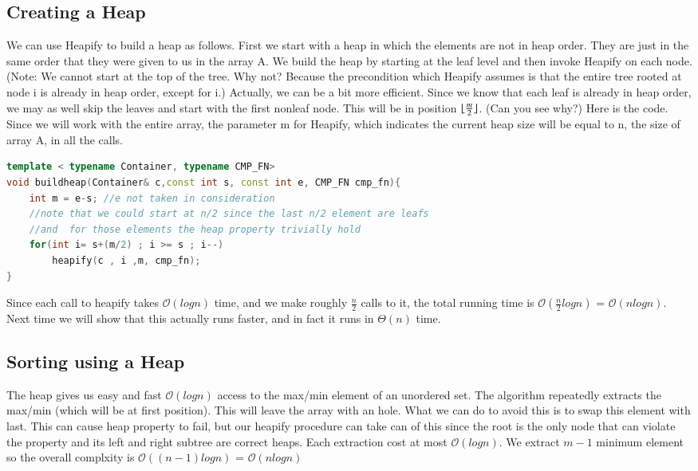 \subsection{Creating a Heap}
We can use Heapify to build a heap as follows. First we start with a heap in which the elements are not in heap order. They are just in the same order that they were given to us in the array A. We build the heap by starting at the leaf level and then invoke Heapify on each node. (Note: We cannot start at the top of the tree. Why not? Because the precondition which Heapify assumes is that the entire tree rooted at node i is already in heap order, except for i.) Actually, we can be a bit more efficient. Since we know that each leaf is already in heap order, we may as well skip the leaves and start with the first nonleaf node. This will be in position $\lfloor\frac{m}{2}\rfloor$. (Can you see why?)
Here is the code. Since we will work with the entire array, the parameter m for Heapify, which indicates
the current heap size will be equal to n, the size of array A, in all the calls.

\begin{lstlisting}[language=c++, caption="Create an heap from an unordered collection. cmp\_fn determines if it will be a min or max heap"]
template < typename Container, typename CMP_FN>
void buildheap(Container& c,const int s, const int e, CMP_FN cmp_fn){
    int m = e-s; //e not taken in consideration
    //note that we could start at n/2 since the last n/2 element are leafs
    //and  for those elements the heap property trivially hold
    for(int i= s+(m/2) ; i >= s ; i--)
        heapify(c , i ,m, cmp_fn);
}
\end{lstlisting}
 Since each call to heapify takes $\mathcal{O}(log n)$ time, and we make roughly $\frac{n}{2}$ calls to it, the total running time is $\mathcal{O}(\frac{n}{2} log n)$ = $\mathcal{O}(nlog n)$. Next time we will show that this actually runs faster, and in fact it runs in $\mathcal{\Theta}(n)$ time.
\subsection{Sorting using a Heap}
The heap gives us easy and fast $\mathcal{O}(log n)$ access to the max/min element of an unordered set.
The algorithm repeatedly extracts the max/min (which will be at first position). This will leave the array with an hole. What we can do to avoid this is to swap this element with last. This can cause heap property to fail, but our heapify procedure can take can of this since the root is the only node that can violate the property and its left and right subtree are correct heaps.
Each extraction cost at most $\mathcal{O}(log n)$. We extract $m-1$ minimum element so the overall complxity is $\mathcal{O}((n-1)log n)$ = $\mathcal{O}(nlog n)$

